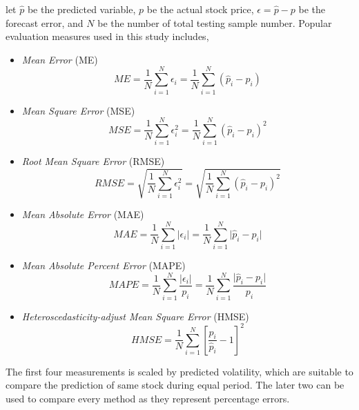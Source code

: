 let $ \hat{p} $ be the predicted variable, $ p $ be the actual stock price, $ \epsilon = \hat{p} - p $ be the forecast error, and $ N $ be the number of total testing sample number. Popular evaluation measures used in this study includes\cite{poon2005practical},
\begin{itemize}
	\item \textit{Mean Error} (ME)
	\begin{equation}
	ME=\frac{1}{N} \sum_{i=1}^{N}\epsilon_i=\frac{1}{N} \sum_{i=1}^{N} (\hat{p}_i - p_i)
	\end{equation}
	
	\item \textit{Mean Square Error} (MSE)
	\begin{equation}
	MSE = \frac{1}{N} \sum_{i=1}^{N}\epsilon_i^2=\frac{1}{N} \sum_{i=1}^{N} (\hat{p}_i - p_i)^2
	\end{equation}
	
	\item \textit{Root Mean Square Error} (RMSE)
	\begin{equation}
	RMSE = \sqrt{\frac{1}{N} \sum_{i=1}^{N}\epsilon_i^2}=\sqrt{\frac{1}{N} \sum_{i=1}^{N} (\hat{p}_i - p_i)^2}
	\end{equation}
	
	\item \textit{Mean Absolute Error} (MAE)
	\begin{equation}
	MAE=\frac{1}{N} \sum_{i=1}^{N} \lvert \epsilon_i \rvert =\frac{1}{N} \sum_{i=1}^{N} \lvert \hat{p}_i - p_i \rvert
	\end{equation}
	
	\item \textit{Mean Absolute Percent Error} (MAPE)
	\begin{equation}
	MAPE=\frac{1}{N} \sum_{i=1}^{N} \frac{\lvert \epsilon_i \rvert}{p_i} =\frac{1}{N} \sum_{i=1}^{N} \frac{\lvert \hat{p}_i - p_i \rvert}{p_i}
	\end{equation}
	
	\item \textit{Heteroscedasticity-adjust Mean Square Error} (HMSE)
	\begin{equation}
	HMSE=\frac{1}{N} \sum_{i=1}^{N}[\frac{p_i}{\hat{p}_i}- 1]^2
	\end{equation}
\end{itemize}
The first four measurements is scaled by predicted volatility, which are suitable to compare the prediction of same stock during equal period. The later two can be used to compare every method as they represent percentage errors.\\


